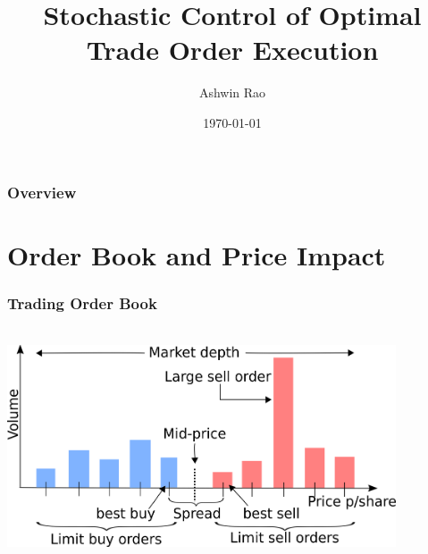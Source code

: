 \documentclass[handout]{beamer}
\title[Optimal Order Execution]{Stochastic Control of Optimal Trade Order Execution} %
\author{Ashwin Rao} %
\institute[Stanford] %
{
ICME, Stanford University
}
\date{\today} %
\begin{document}
\begin{frame}
\titlepage %
\end{frame}

\begin{frame}
\frametitle{Overview} %
\tableofcontents %
\end{frame}

\section{Order Book and Price Impact}

\begin{frame}
\frametitle{Trading Order Book}
\includegraphics[width=11.5cm, height=7cm]{order_book.png}
\end{frame}
\end{document}
